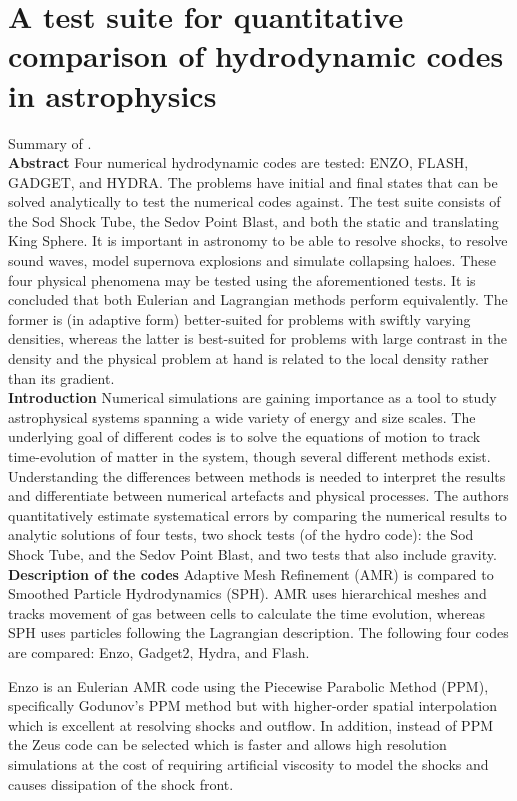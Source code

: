 \documentclass[MScProj_TLRH_ClusterEnergy.tex]{subfiles}
\begin{document}
\section*{A test suite for quantitative comparison of hydrodynamic codes in astrophysics}
\label{sec:Tasker2008}
Summary of \citet{2008MNRAS.390.1267T}.
\\
\textbf{Abstract}
Four numerical hydrodynamic codes are tested: ENZO, FLASH, GADGET, and HYDRA. The problems have initial and final states that can be solved analytically to test the numerical codes against. The test suite consists of the Sod Shock Tube, the Sedov Point Blast, and both the static and translating King Sphere. It is important in astronomy to be able to resolve shocks, to resolve sound waves, model supernova explosions and simulate collapsing haloes. These four physical phenomena may be tested using the aforementioned tests. It is concluded that both Eulerian and Lagrangian methods perform equivalently. The former is (in adaptive form) better-suited for problems with swiftly varying densities, whereas the latter is best-suited for problems with large contrast in the density and the physical problem at hand is related to the local density rather than its gradient.
\\
\textbf{Introduction}
Numerical simulations are gaining importance as a tool to study astrophysical systems spanning a wide variety of energy and size scales. The underlying goal of different codes is to solve the equations of motion to track time-evolution of matter in the system, though several different methods exist. Understanding the differences between methods is needed to interpret the results and differentiate between numerical artefacts and physical processes. The authors quantitatively estimate systematical errors by comparing the numerical results to analytic solutions of four tests, two shock tests (of the hydro code): the Sod Shock Tube, and the Sedov Point Blast, and two tests that also include gravity.
\\
\textbf{Description of the codes}
Adaptive Mesh Refinement (AMR) is compared to Smoothed Particle Hydrodynamics (SPH). AMR uses hierarchical meshes and tracks movement of gas between cells to calculate the time evolution, whereas SPH uses particles following the Lagrangian description. The following four codes are compared: Enzo, Gadget2, Hydra, and Flash.

Enzo is an Eulerian AMR code using the Piecewise Parabolic Method (PPM), specifically Godunov's PPM method but with higher-order spatial interpolation which is excellent at resolving shocks and outflow. In addition, instead of PPM the Zeus code can be selected which is faster and allows high resolution simulations at the cost of requiring artificial viscosity to model the shocks and causes dissipation of the shock front.
\end{document}
